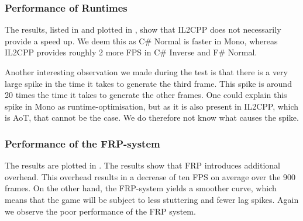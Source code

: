 
\subsubsection{Performance of Runtimes}
The results, listed in  and plotted in , show that IL2CPP does not necessarily provide a speed up. We deem this as C\# Normal is faster in Mono, whereas IL2CPP provides roughly 2 more \gls{FPS} in C\# Inverse and F\# Normal.

Another interesting observation we made during the test is that there is a very large spike in the time it takes to generate the third frame. This spike is around 20 times the time it takes to generate the other frames. One could explain this spike in Mono as runtime-optimisation, but as it is also present in IL2CPP, which is \gls{AoT}, that cannot be the case. We do therefore not know what causes the spike.

\begin{table}[H]
    \caption{Average framerate in Unity's two runtimes measured with 250 unites in the scene.}
    \label{tab:unity:ai:runtime}
\end{table}


\subsubsection{Performance of the FRP-system}
The results are plotted in . The results show that \gls{FRP} introduces additional overhead. This overhead results in a decrease of ten \gls{FPS} on average over the 900 frames. On the other hand, the \gls{FRP}-system yields a smoother curve, which means that the game will be subject to less stuttering and fewer lag spikes. Again we observe the poor performance of the \gls{FRP} system.

